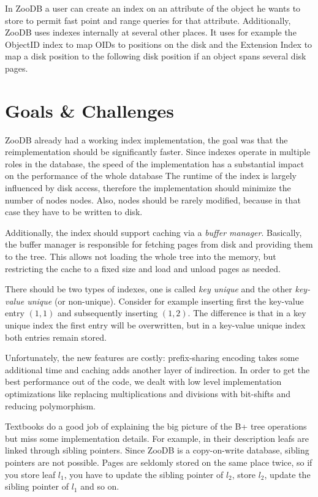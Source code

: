 \documentclass[11pt,a4paper,oneside]{article}
\begin{document}
In ZooDB a user can create an index on an attribute of the object he wants to store to permit fast point and range queries for that attribute.
Additionally, ZooDB uses indexes internally at several other places.
It uses for example the ObjectID index to map OIDs to positions on the disk and the Extension Index to map a disk position to the following disk position if an object spans several disk pages. 

\section{Goals \& Challenges}
ZooDB already had a working index implementation, the goal was that the reimplementation should be significantly faster. 
Since indexes operate in multiple roles in the database, the speed of the implementation has a substantial impact on the performance of the whole database
The runtime of the index is largely influenced by disk access, therefore the implementation should minimize the number of nodes nodes.
Also, nodes should be rarely modified, because in that case they have to be written to disk.

Additionally, the index should support caching via a \emph{buffer manager}. 
Basically, the buffer manager is responsible for fetching pages from disk and providing them to the tree.
This allows not loading the whole tree into the memory, but restricting the cache to a fixed size and load and unload pages as needed.

There should be two types of indexes, one is called \emph{key unique} and the other \emph{key-value unique} (or non-unique). 
Consider for example inserting first the key-value entry $(1,1)$ and subsequently inserting $(1,2)$.
The difference is that in a key unique index the first entry will be overwritten, but in a key-value unique index both entries remain stored. 

Unfortunately, the new features are costly: prefix-sharing encoding takes some additional time and caching adds another layer of indirection.
In order to get the best performance out of the code, we dealt with low level implementation optimizations like replacing multiplications and divisions with bit-shifts and reducing polymorphism.

Textbooks do a good job of explaining the big picture of the B+ tree operations but miss some implementation details.
For example, in their description leafs are linked through sibling pointers. Since ZooDB is a copy-on-write database, sibling pointers are not possible.
Pages are seldomly stored on the same place twice, so if you store leaf $l_1$, you have to update the sibling pointer of $l_2$, store $l_2$, update the sibling pointer of $l_1$ and so on.
\end{document}
